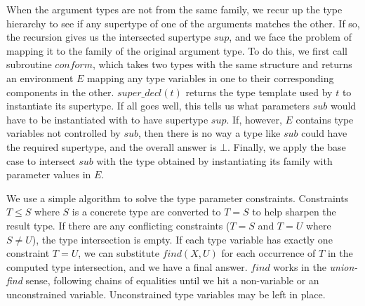 \documentclass[9pt]{sigplanconf}
\begin{document}

When the argument types are not from the same family, we recur up the
type hierarchy to see if any supertype of one of the arguments matches
the other. If so, the recursion gives us the intersected supertype $sup$,
and we face the problem of mapping it to the family of the original argument
type. To do this, we first call subroutine $conform$, which takes two types
with the same structure and returns an environment $E$ mapping any
type variables in one to their corresponding components in the other.
$super\_decl(t)$ returns the type template used by $t$ to instantiate its
supertype. If all goes well, this tells us what parameters $sub$ would
have to be instantiated with to have supertype $sup$. If, however, $E$
contains type variables not controlled by $sub$, then there is no way
a type like $sub$ could have the required supertype, and the overall answer
is $\bot$.
Finally, we apply the base case to intersect $sub$ with the type obtained
by instantiating its family with parameter values in $E$.

We use a simple algorithm to solve the type parameter constraints.
Constraints $T\leq S$ where $S$ is a concrete type are converted to
$T=S$ to help sharpen the result type.
If there are any conflicting constraints ($T=S$ and $T=U$ where $S\neq U$),
the type intersection is empty. If each type variable has exactly one
constraint $T=U$, we can substitute $find(X,U)$ for each occurrence
of $T$ in the computed type intersection, and we have a final answer.
$find$ works in the \emph{union-find} sense, following chains of equalities
until we hit a non-variable or an unconstrained variable. Unconstrained
type variables may be left in place.
\end{document}
